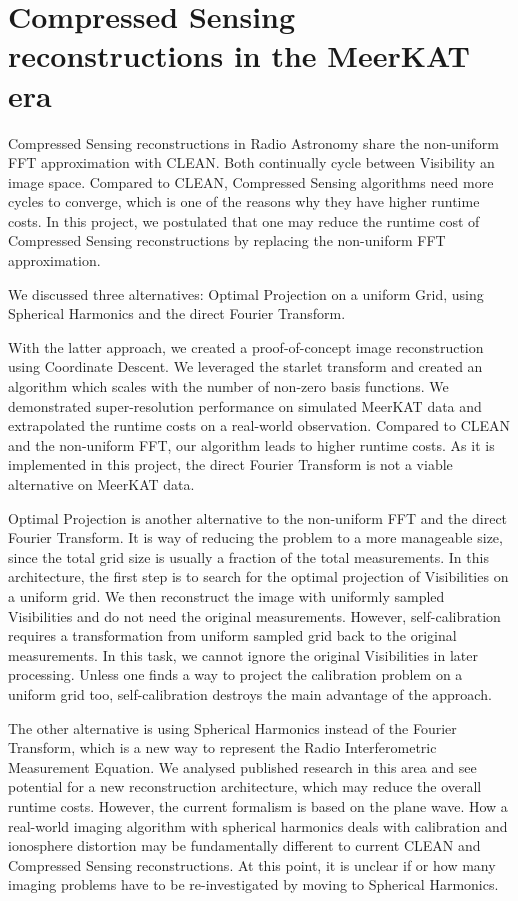 \section{Compressed Sensing reconstructions in the MeerKAT era}
Compressed Sensing reconstructions in Radio Astronomy share the non-uniform FFT approximation with CLEAN. Both continually cycle between Visibility an image space. Compared to CLEAN, Compressed Sensing algorithms need more cycles to converge, which is one of the reasons why they have higher runtime costs. In this project, we postulated that one may reduce the runtime cost of Compressed Sensing reconstructions by replacing the non-uniform FFT approximation. 

We discussed three alternatives: Optimal Projection on a uniform Grid, using Spherical Harmonics and the direct Fourier Transform. 

With the latter approach, we created a proof-of-concept image reconstruction using  Coordinate Descent. We leveraged the starlet transform and created an algorithm which scales with the number of non-zero basis functions. We demonstrated super-resolution performance on simulated MeerKAT data and extrapolated the runtime costs on a real-world observation. Compared to CLEAN and the non-uniform FFT, our algorithm leads to higher runtime costs. As it is implemented in this project, the direct Fourier Transform is not a viable alternative on MeerKAT data.

Optimal Projection is another alternative to the non-uniform FFT and the direct Fourier Transform. It is way of reducing the problem to a more manageable size, since the total grid size is usually a fraction of the total measurements. In this architecture, the first step is to search for the optimal projection of Visibilities on a uniform grid. We then reconstruct the image with uniformly sampled Visibilities and do not need the original measurements. However, self-calibration requires a transformation from uniform sampled grid back to the original measurements. In this task, we cannot ignore the original Visibilities in later processing. Unless one finds a way to project the calibration problem on a uniform grid too, self-calibration destroys the main advantage of the approach.

The other alternative is using Spherical Harmonics instead of the Fourier Transform, which is a new way to represent the Radio Interferometric Measurement Equation. We analysed published research in this area\cite{carozzi2015imaging, mcewen2008simulating} and see potential for a new reconstruction architecture, which may reduce the overall runtime costs. However, the current formalism\cite{smirnov2011revisiting} is based on the plane wave. How a real-world imaging algorithm with spherical harmonics deals with calibration and ionosphere distortion may be fundamentally different to current CLEAN and Compressed Sensing reconstructions. At this point, it is unclear if or how many imaging problems have to be re-investigated by moving to Spherical Harmonics.

